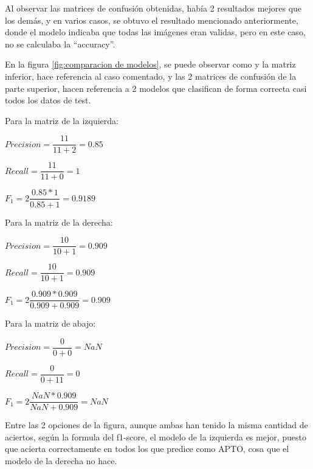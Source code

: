 Al observar las matrices de confusión obtenidas, había 2 resultados mejores que los demás, y en varios casos, se obtuvo el resultado mencionado anteriormente, donde el modelo indicaba que todas las imágenes eran validas, pero en este caso, no se calculaba la ``accuracy''.

En la figura \ref{fig:comparacion de modelos}, se puede observar como y la matriz inferior, hace referencia al caso comentado, y las 2 matrices de confusión de la parte superior, hacen referencia a 2 modelos que clasifican de forma correcta casi todos los datos de test.

Para la matriz de la izquierda:
\begin{center}
    $Precision = \dfrac{11} {11 + 2} = 0.85 $

    $Recall = \dfrac{11} {11 + 0} = 1 $

    $F_1 = 2 \dfrac{0.85 * 1} {0.85 + 1} = 0.9189 $
\end{center}


Para la matriz de la derecha:
\begin{center}
    $Precision = \dfrac{10} {10 + 1} = 0.909 $

    $Recall = \dfrac{10} {10 + 1} = 0.909 $

    $F_1 = 2 \dfrac{0.909 * 0.909} {0.909 + 0.909} = 0.909 $    
\end{center}

Para la matriz de abajo:

\begin{center}
    $Precision = \dfrac{0} {0 + 0} = NaN $

    $Recall = \dfrac{0} {0 + 11} = 0 $

    $F_1 = 2 \dfrac{NaN * 0.909} {NaN + 0.909} = NaN $    
\end{center}
Entre las 2 opciones de la figura, aunque ambas han tenido la misma cantidad de aciertos, según la formula del f1-score, el modelo de la izquierda es mejor, puesto que acierta correctamente en todos los que predice como APTO, cosa que el modelo de la derecha no hace.

